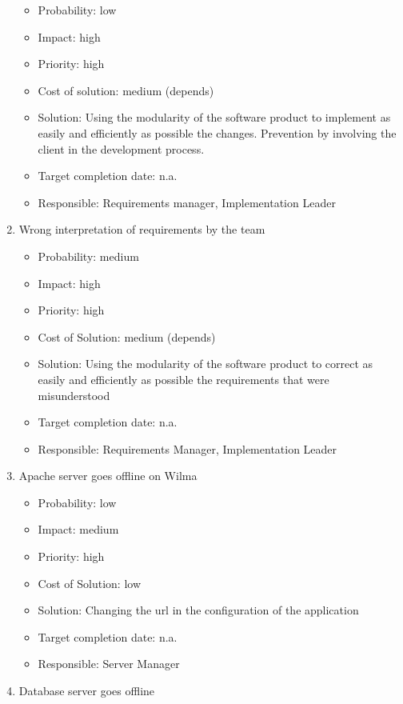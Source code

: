 \documentclass[12pt]{article}
\begin{document}
\begin{enumerate}
  \begin{itemize}
  \itemsep1pt\parskip0pt
  \item
    Probability: low
  \item
    Impact: high
  \item
    Priority: high
  \item
    Cost of solution: medium (depends)
  \item
    Solution: Using the modularity of the software product to implement
    as easily and efficiently as possible the changes. Prevention by
    involving the client in the development process.
  \item
    Target completion date: n.a.
  \item
    Responsible: Requirements manager, Implementation Leader
  \end{itemize}
\item
  Wrong interpretation of requirements by the team

  \begin{itemize}
  \itemsep1pt\parskip0pt
  \item
    Probability: medium
  \item
    Impact: high
  \item
    Priority: high
  \item
    Cost of Solution: medium (depends)
  \item
    Solution: Using the modularity of the software product to correct as
    easily and efficiently as possible the requirements that were
    misunderstood
  \item
    Target completion date: n.a.
  \item
    Responsible: Requirements Manager, Implementation Leader
  \end{itemize}
\item
  Apache server goes offline on Wilma

  \begin{itemize}
  \itemsep1pt\parskip0pt
  \item
    Probability: low
  \item
    Impact: medium
  \item
    Priority: high
  \item
    Cost of Solution: low
  \item
    Solution: Changing the url in the configuration of the application
  \item
    Target completion date: n.a.
  \item
    Responsible: Server Manager
  \end{itemize}
\item
  Database server goes offline


\end{enumerate}
\end{document}

